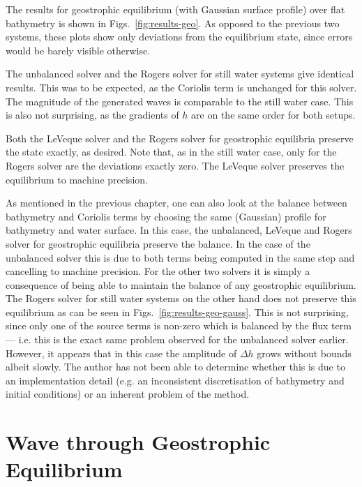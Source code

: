 The results for geostrophic equilibrium (with Gaussian surface profile) over flat bathymetry is shown in Figs.~\ref{fig:results-geo}. As opposed to the previous two systems, these plots show only deviations from the equilibrium state, since errors would be barely visible otherwise.

The unbalanced solver and the Rogers solver for still water systems give identical results. This was to be expected, as the Coriolis term is unchanged for this solver. The magnitude of the generated waves is comparable to the still water case. This is also not surprising, as the gradients of $h$ are on the same order for both setups.

Both the LeVeque solver and the Rogers solver for geostrophic equilibria preserve the state exactly, as desired. Note that, as in the still water case, only for the Rogers solver are the deviations exactly zero. The LeVeque solver preserves the equilibrium to machine precision.

As mentioned in the previous chapter, one can also look at the balance between bathymetry and Coriolis terms by choosing the same (Gaussian) profile for bathymetry and water surface. In this case, the unbalanced, LeVeque and Rogers solver for geostrophic equilibria preserve the balance. In the case of the unbalanced solver this is due to both terms being computed in the same step and cancelling to machine precision. For the other two solvers it is simply a consequence of being able to maintain the balance of any geostrophic equilibrium. The Rogers solver for still water systems on the other hand does not preserve this equilibrium as can be seen in Figs.~\ref{fig:results-geo-gauss}. This is not surprising, since only one of the source terms is non-zero which is balanced by the flux term --- i.e. this is the exact same problem observed for the unbalanced solver earlier. However, it appears that in this case the amplitude of $\Delta h$ grows without bounds albeit slowly. The author has not been able to determine whether this is due to an implementation detail (e.g. an inconsistent discretisation of bathymetry and initial conditions) or an inherent problem of the method.

\section{Wave through Geostrophic Equilibrium}

